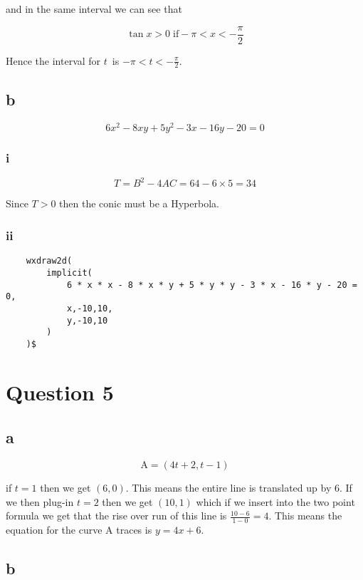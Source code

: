 \documentclass{article}
\begin{document}
and in the same interval we can see that

$$\tan x > 0 \;\mathrm{if} -\pi < x < - \frac \pi 2$$

Hence the interval for $t$ is $-\pi < t < - \frac \pi 2$.

\subsection{b}

$$6x^2 - 8xy + 5y^2 - 3x - 16y - 20 = 0$$

\subsubsection{i}

$$T = B^2 - 4 AC = 64 - 6 \times 5 = 34$$

Since $T > 0$ then the conic must be a Hyperbola.

\subsubsection{ii}

\begin{lstlisting}
	wxdraw2d(
        implicit(
            6 * x * x - 8 * x * y + 5 * y * y - 3 * x - 16 * y - 20 = 0,
            x,-10,10,
            y,-10,10
        )
	)$
\end{lstlisting}

\section{Question 5}

\subsection{a}

$$\mathrm A = (4 t + 2 , t - 1)$$

if $t=1$ then we get $(6,0)$. This means the entire line is translated up by $6$. If we then plug-in $t=2$ then we get $(10,1)$ which if we insert into the two point formula we get that the rise over run of this line is $\frac {10 - 6}{1 - 0} = 4$. This means the equation for the curve $\mathrm A$ traces is $y = 4x + 6$.

\subsection{b}
\end{document}
